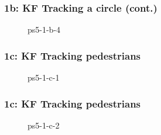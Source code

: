 \documentclass[../report.tex]{subfiles}
\begin{document}
    \begin{frame}
        \frametitle{1b: KF Tracking a circle (cont.)}
        \begin{figure}[!htb]
            \centering
            \caption{ps5-1-b-4} 
        \end{figure}
    \end{frame}

    \begin{frame}
        \frametitle{1c: KF Tracking pedestrians}
        \begin{figure}[!htb]
            \centering
            \caption{ps5-1-c-1} 
        \end{figure}
    \end{frame}

    \begin{frame}
        \frametitle{1c: KF Tracking pedestrians}
        \begin{figure}[!htb]
            \centering
            \caption{ps5-1-c-2} 
        \end{figure}
    \end{frame}
\end{document}
